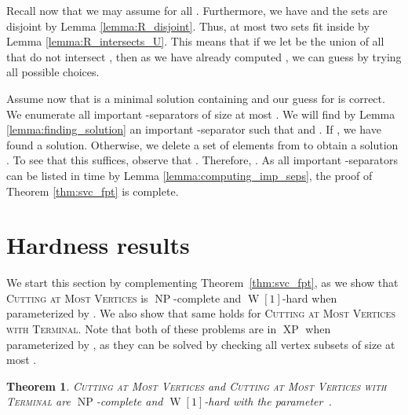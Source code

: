 \documentclass[a4paper,11pt]{article}
\newtheorem{theorem}{Theorem}
\theoremstyle{definition}
\theoremstyle{remark}
\DeclareMathOperator{\operatorClassNP}{NP}
\newcommand{\classNP}{\ensuremath{\operatorClassNP}}
\DeclareMathOperator{\operatorClassW}{W}
\newcommand{\classW}[1]{\ensuremath{\operatorClassW[#1]}}
\DeclareMathOperator{\operatorClassXP}{XP}
\newcommand{\classXP}{\ensuremath{\operatorClassXP}}
\begin{document}
Recall now that we may assume  for all . Furthermore, we have  and the sets  are disjoint by Lemma \ref{lemma:R_disjoint}. Thus, at most two sets  fit inside  by Lemma \ref{lemma:R_intersects_U}. This means that if we let  be the union of all  that do not intersect , then as we have already computed , we can guess  by trying all  possible choices.

Assume now that  is a minimal solution containing  and our guess for  is correct. We enumerate all important -separators of size at most . We will find by Lemma \ref{lemma:finding_solution} an important -separator  such that  and . If , we have found a solution.
Otherwise, we delete a set  of  elements from  to obtain a solution . To see that this suffices, observe that . Therefore, . 
As all important -separators can be listed in time  by Lemma \ref{lemma:computing_imp_seps}, the proof of Theorem \ref{thm:svc_fpt} is complete.









\section{Hardness results}
We start this section by complementing Theorem~\ref{thm:svc_fpt}, as we show that \textsc{Cutting at Most   Vertices} is \classNP-complete and \classW{1}-hard when parameterized by . We also show that same holds for
\textsc{Cutting at Most   Vertices with Terminal}. Note that both of these problems are in \classXP{} when parameterized by , as they can be solved by checking all vertex subsets of size at most .

\begin{theorem}\label{thm:svc_is_hard}
\textsc{Cutting at Most   Vertices} and \textsc{Cutting at Most   Vertices with Terminal} are \classNP-complete and \classW{1}-hard with the parameter~.
\end{theorem}
\end{document}
